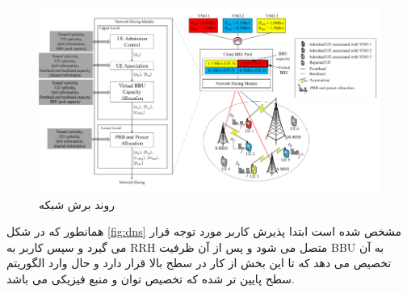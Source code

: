 \begin{figure}[H]
  \centering
    \includegraphics[scale = 0.7]{./fig/dynamicNS}
  \caption{روند برش شبکه\ \cite{lee2018dynamic}}
  \label{fig:dns}
\end{figure}
همانطور که در شکل \eqref{fig:dns} 
مشخص شده است ابتدا پذیرش کاربر مورد توجه قرار می گیرد و سپس کاربر به RRH متصل می شود و پس از آن ظرفیت BBU به آن تخصیص می دهد که تا این بخش از کار در سطح بالا قرار دارد و حال وارد الگوریتم سطح پایین تر شده که تخصیص توان و منبع فیزیکی می باشد.

